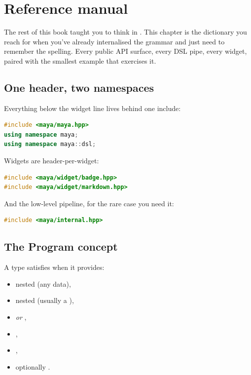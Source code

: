 \chapter{Reference manual}
\label{ch:refman}

\begin{aside}
The rest of this book taught you to think in \maya{}. This
chapter is the dictionary you reach for when you've already
internalised the grammar and just need to remember the
spelling. Every public API surface, every DSL pipe, every
widget, paired with the smallest example that exercises it.
\end{aside}

\section{One header, two namespaces}

Everything below the widget line lives behind one include:

\begin{lstlisting}[language=C++]
#include <maya/maya.hpp>
using namespace maya;
using namespace maya::dsl;
\end{lstlisting}

\noindent Widgets are header-per-widget:

\begin{lstlisting}[language=C++]
#include <maya/widget/badge.hpp>
#include <maya/widget/markdown.hpp>
\end{lstlisting}

\noindent And the low-level pipeline, for the rare case you
need it:

\begin{lstlisting}[language=C++]
#include <maya/internal.hpp>
\end{lstlisting}

\section{The Program concept}

A type  satisfies  when it provides:

\begin{itemize}[leftmargin=*]
  \item nested  (any data),
  \item nested  (usually a ),
  \item {} \emph{or}
    ,
  \item {},
  \item {},
  \item optionally .
\end{itemize}

